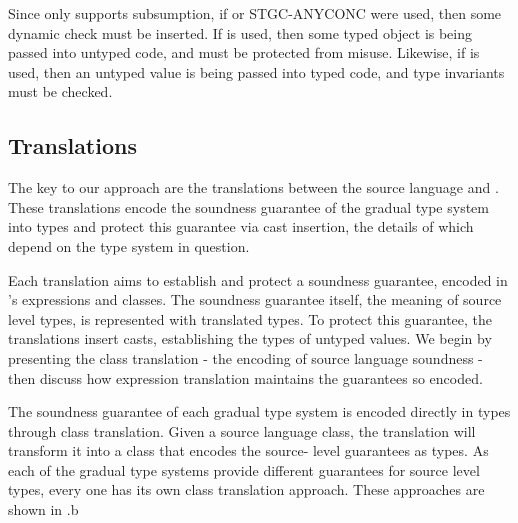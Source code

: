 \documentclass[a4paper,USenglish]{tex/lipics-v2016}
\begin{document}
Since \kafka only supports subsumption, if  or \RuleRef
{STGC-ANYCONC} were used, then some dynamic check must be inserted. If
 is used, then some typed object is being passed into
untyped code, and must be protected from misuse. Likewise, if  is used, then an untyped value is being passed into typed code,
and type invariants must be checked. 

\subsection{Translations}

The key to our approach are the translations between the source language and
\kafka. These translations encode the soundness guarantee of the gradual type
system into \kafka types and protect this guarantee via cast insertion, the
details of which depend on the type system in question.

Each translation aims to establish and protect a \kafka soundness guarantee,
encoded in \kafka's expressions and classes. The soundness guarantee itself,
the meaning of source level types, is represented with translated \kafka
types. To protect this guarantee, the translations insert casts, establishing
the  types of untyped values. We begin by presenting the class translation -
the encoding of source language soundness - then discuss how expression
translation maintains the guarantees so encoded.

The soundness guarantee of each gradual type system is encoded directly in
\kafka types through class translation. Given a source language class, the
translation will transform it into a \kafka class that encodes the source-
level guarantees as \kafka types. As each of the gradual type systems provide
different guarantees for source level types, every one has its own class
translation approach. These approaches are shown in .b
\end{document}
